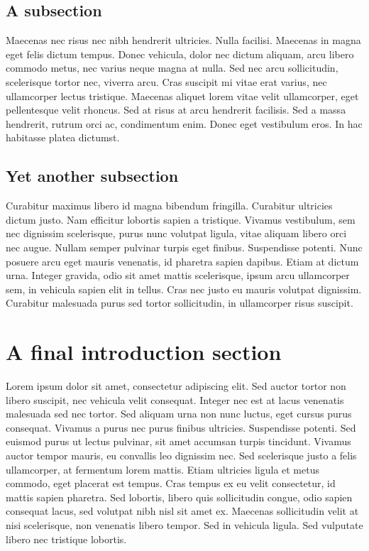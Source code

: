 \subsection{A subsection} 

Maecenas nec risus nec nibh hendrerit ultricies. Nulla facilisi. Maecenas in magna eget felis dictum tempus. Donec vehicula, dolor nec dictum aliquam, arcu libero commodo metus, nec varius neque magna at nulla. Sed nec arcu sollicitudin, scelerisque tortor nec, viverra arcu. Cras suscipit mi vitae erat varius, nec ullamcorper lectus tristique. Maecenas aliquet lorem vitae velit ullamcorper, eget pellentesque velit rhoncus. Sed at risus at arcu hendrerit facilisis. Sed a massa hendrerit, rutrum orci ac, condimentum enim. Donec eget vestibulum eros. In hac habitasse platea dictumst.

\subsection{Yet another subsection} 

Curabitur maximus libero id magna bibendum fringilla. Curabitur ultricies dictum justo. Nam efficitur lobortis sapien a tristique. Vivamus vestibulum, sem nec dignissim scelerisque, purus nunc volutpat ligula, vitae aliquam libero orci nec augue. Nullam semper pulvinar turpis eget finibus. Suspendisse potenti. Nunc posuere arcu eget mauris venenatis, id pharetra sapien dapibus. Etiam at dictum urna. Integer gravida, odio sit amet mattis scelerisque, ipsum arcu ullamcorper sem, in vehicula sapien elit in tellus. Cras nec justo eu mauris volutpat dignissim. Curabitur malesuada purus sed tortor sollicitudin, in ullamcorper risus suscipit.

\section{A final introduction section} 

Lorem ipsum dolor sit amet, consectetur adipiscing elit. Sed auctor tortor non libero suscipit, nec vehicula velit consequat. Integer nec est at lacus venenatis malesuada sed nec tortor. Sed aliquam urna non nunc luctus, eget cursus purus consequat. Vivamus a purus nec purus finibus ultricies. Suspendisse potenti. Sed euismod purus ut lectus pulvinar, sit amet accumsan turpis tincidunt. Vivamus auctor tempor mauris, eu convallis leo dignissim nec. Sed scelerisque justo a felis ullamcorper, at fermentum lorem mattis. Etiam ultricies ligula et metus commodo, eget placerat est tempus. Cras tempus ex eu velit consectetur, id mattis sapien pharetra. Sed lobortis, libero quis sollicitudin congue, odio sapien consequat lacus, sed volutpat nibh nisl sit amet ex. Maecenas sollicitudin velit at nisi scelerisque, non venenatis libero tempor. Sed in vehicula ligula. Sed vulputate libero nec tristique lobortis.

